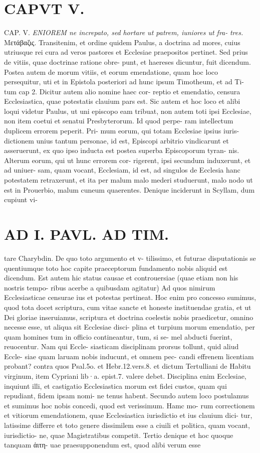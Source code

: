 \documentclass{article}
\begin{document}
\begin{pages}
\section*{CAPVT  V. }
\marginpar{[ p.239 ]}CAP. V. \textit{ENIOREM ne increpato, sed} \textit{hortare ut patrem, iuniores ut fra-} \textit{tres.} Μετάβαζις. Transitenim, et ordine quidem Paulus, a doctrina ad mores, cuius utriusque rei cura ad veros pastores et Ecclesiae praepositos pertinet. Sed prius de vitiis, quae doctrinae ratione obre- punt, et haereses dicuntur, fuit dicendum. Postea autem de morum vitiis, et eorum emendatione, quam hoc loco persequitur, uti et in Epistola posteriori ad hunc ipsum Timotheum, et ad Ti- tum cap 2. Dicitur autem alio nomine haec cor- reptio et emendatio, censura Ecclesiastica, quae potestatis clauium pars est. Sic autem et hoc loco et alibi loqui videtur Paulus, ut uni episcopo eam tribuat, non autem toti ipsi Ecclesiae, non item coetui et senatui Presbyterorum. Id quod perpe- ram intellectum duplicem errorem peperit. Pri- mum eorum, qui totam Ecclesiae ipsius iuris- dictionem unius tantum personae, id est, Episcopi arbitrio vindicarunt et asseruerunt, ex quo ipso inducta est postea superba Episcoporum tyran- nis. Alterum eorum, qui ut hunc errorem cor- rigerent, ipsi secundum induxerunt, et ad uniuer- sam, quam vocant, Ecclesiam, id est, ad singulos de Ecclesia hanc potestatem retraxerunt, et ita per malum malo mederi studuerunt, malo nodo ut est in Prouerbio, malum cuneum quaerentes. Denique inciderunt in Scyllam, dum cupiunt vi- 
\section*{AD I. PAVL. AD TIM. }
\marginpar{[ p.240 ]}tare Charybdin. De quo toto argumento et v- tilissimo, et futurae disputationis se quentiumque toto hoc capite praeceptorum fundamento nobis aliquid est dicendum. Est autem hic status causae et controuersiae (quae etiam non his nostris tempo- ribus acerbe a quibusdam agitatur) Ad quos nimirum Ecclesiasticae censurae ius et potestas pertineat. Hoc enim pro concesso sumimus, quod tota docet scriptura, cum vitae sancte et honeste instituendae gratia, et ut Dei gloriae inseruiamus, scriptura et doctrina coelestis nobis praedicetur, omnino necesse esse, ut aliqua sit Ecclesiae disci- plina et turpium morum emendatio, per quam homines tum in officio contineantur, tum, si se- mel abducti fuerint, reuocentur. Nam qui Eccle- siasticam disciplinam prorsus tollunt, quid aliud Eccle- siae quam laruam nobis inducunt, et omnem pec- candi effrenem licentiam probant? contra quos Psal.5o. et Hebr.12.vers.8. et dictum Tertulliani de Habitu virginum, item Cypriani lib·a. epist.7. valere debet. Disciplina enim Ecclesiae, inquiunt illi, et castigatio Ecclesiastica morum est fidei custos, quam qui repudiant, fidem ipsam nomi- ne tenus habent. Secundo autem loco postulamus et sumimus hoc nobis concedi, quod est verissimum. Hamc mo- rum correctionem et vitiorum emendationem, quae Ecclesiastica iurisdictio et ius clauium dici- tur, latissime differre et toto genere dissimilem esse a ciuili et politica, quam vocant, iurisdictio- ne, quae Magistratibus competit. Tertio denique et hoc quoque tanquam ἀιτη- uae praesupponendum est, quod alibi verum esse 

\end{pages}
\end{document}

